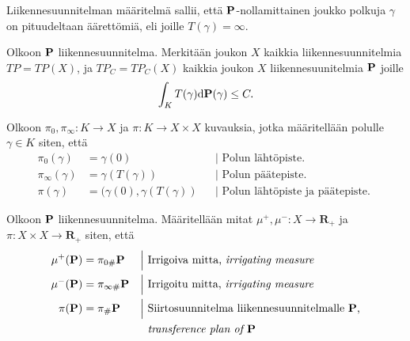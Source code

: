 Liikennesuunnitelman määritelmä sallii, että $\P$-nollamittainen joukko polkuja $\gamma$ on pituudeltaan äärettömiä, eli joille $T(\gamma) = \infty$.

\begin{definition}
    Olkoon $\P$ liikennesuunnitelma. Merkitään joukon $X$ kaikkia liikennesuunnitelmia $TP = TP(X)$, ja $TP_C = TP_C(X)$ kaikkia joukon $X$ liikennesuunitelmia $\P$ joille
    \begin{equation*}
        \int_K T(\gamma) \d \P(\gamma) \le C.
    \end{equation*}
\end{definition}

\begin{definition}
    Olkoon $\pi_0, \pi_\infty: K\to X$ ja $\pi:K\to X \times X$ kuvauksia, jotka määritellään polulle $\gamma \in K$ siten, että 
    \begin{align*}
        \pi_0(\gamma) &= \gamma(0) &&\Big| \text{ Polun lähtöpiste. }\\
        \pi_\infty(\gamma) &= \gamma(T(\gamma)) &&\Big| \text{ Polun päätepiste. }\\
        \pi(\gamma) &= (\gamma(0), \gamma(T(\gamma)) &&\Big| \text{ Polun lähtöpiste ja päätepiste. }
    \end{align*}
\end{definition}

\begin{definition}
    Olkoon $\P$ liikennesuunnitelma. Määritellään mitat $\mu^+, \mu^- : X \to \mathbf{R}_+$ ja $\pi: X\times X \to \mathbf{R}_+$ siten, että
    \begin{align*}
        \mu^+(\P) &= \pi_{0\#} \P  &&\Big| \text{ Irrigoiva mitta, \textit{irrigating measure} }\\
        \mu^-(\P) &= \pi_{\infty \#} \P  &&\Big| \text{ Irrigoitu mitta, \textit{irrigating measure} }\\
        \pi(\P) &= \pi_\# \P  &&\Big| \text{ Siirtosuunnitelma liikennesuunnitelmalle $\P$,}\\ 
        & &&\hphantom{\Big|} \text{ \textit{transference plan of $\P$}}
    \end{align*}
\end{definition}

